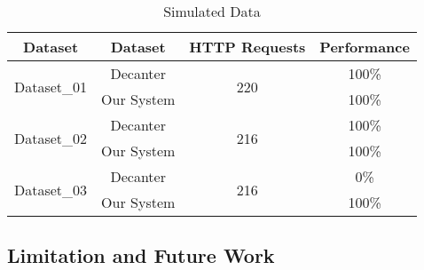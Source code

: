 \begin{table}[]
\centering
\caption{Simulated Data}
\label{tbl:db_01}
\begin{tabular}{|c|c|c|c|}
\hline\hline
Dataset                    & Dataset    & HTTP Requests        & Performance \\ \hline
\multirow{2}{*}{Dataset\_01}  & Decanter   & \multirow{2}{*}{220} & 100\%       \\ \cline{2-2} \cline{4-4} 
                           & Our System &                      & 100\%       \\ \hline
\multirow{2}{*}{Dataset\_02} & Decanter   & \multirow{2}{*}{216} & 100\%       \\ \cline{2-2} \cline{4-4} 
                           & Our System &                      & 100\%       \\ \hline
\multirow{2}{*}{Dataset\_03} & Decanter   & \multirow{2}{*}{216} & 0\%         \\ \cline{2-2} \cline{4-4} 
                           & Our System &                      & 100\%       \\ \hline\hline
\end{tabular}
\end{table}

\subsection{Limitation and Future Work}
